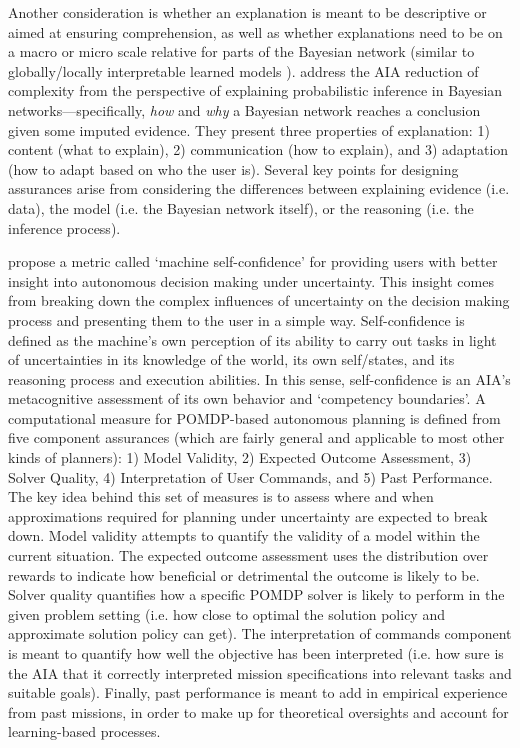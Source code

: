 Another consideration is whether an explanation is meant to be descriptive or aimed at ensuring comprehension, as well as whether explanations need to be on a macro or micro scale relative for parts of the Bayesian network (similar to globally/locally interpretable learned models \cite{Ruping2006-xj}). 
\citet{Lacave2002-cu} address the AIA reduction of complexity from the perspective of explaining probabilistic inference in Bayesian networks---specifically, \emph{how} and \emph{why} a Bayesian network reaches a conclusion given some imputed evidence. 
They present three properties of explanation: 1) content (what to explain), 2) communication (how to explain), and 3) adaptation (how to adapt based on who the user is). Several key points for designing assurances arise from considering the differences between explaining evidence (i.e. data), the model (i.e. the Bayesian network itself), or the reasoning (i.e. the inference process).

\citet{Aitken2016-cv} propose a metric called `machine self-confidence' for providing users with better insight into autonomous decision making under uncertainty. This insight comes from breaking down the complex influences of uncertainty on the decision making process and presenting them to the user in a simple way. Self-confidence is defined as the machine's own perception of its ability to carry out tasks in light of uncertainties in its knowledge of the world, its own self/states, and its reasoning process and execution abilities. In this sense, self-confidence is an AIA's metacognitive assessment of its own behavior and `competency boundaries'. A computational measure for POMDP-based autonomous planning is defined from five component assurances (which are fairly general and applicable to most other kinds of planners): 1) Model Validity, 2) Expected Outcome Assessment, 3) Solver Quality, 4) Interpretation of User Commands, and 5) Past Performance. 
The key idea behind this set of measures is to assess where and when approximations required for planning under uncertainty are expected to break down. Model validity attempts to quantify the validity of a model within the current situation. The expected outcome assessment uses the distribution over rewards to indicate how beneficial or detrimental the outcome is likely to be. Solver quality quantifies how a specific POMDP solver is likely to perform in the given problem setting (i.e. how close to optimal the solution policy and approximate solution policy can get). The interpretation of commands component is meant to quantify how well the objective has been interpreted (i.e. how sure is the AIA that it correctly interpreted mission specifications into relevant tasks and suitable goals). Finally, past performance is meant to add in empirical experience from past missions, in order to make up for theoretical oversights and account for learning-based processes.

